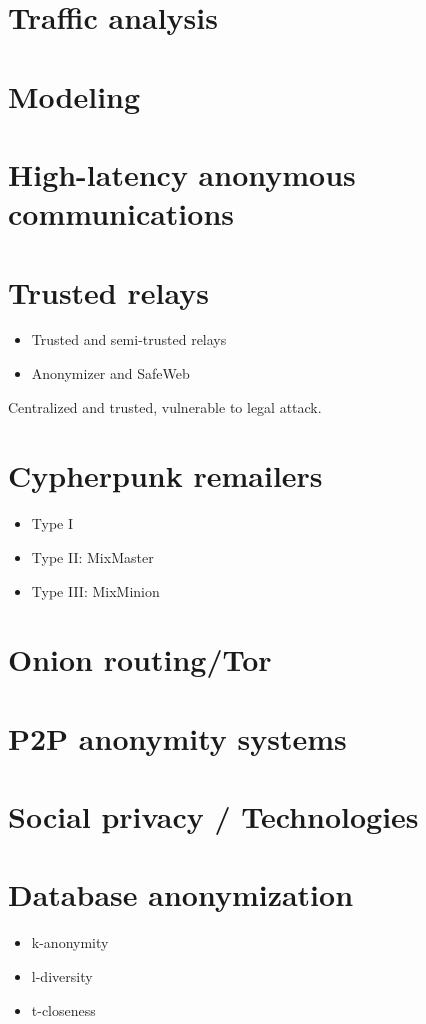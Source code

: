 \documentclass[a4paper,12pt,dutch]{article}
\begin{document}
\section{Traffic analysis}

\section{Modeling}

\section{High-latency anonymous communications}

\section{Trusted relays}
\begin{itemize}
	\item Trusted and semi-trusted relays
	\item Anonymizer and SafeWeb
\end{itemize}
Centralized and trusted, vulnerable to legal attack.

\section{Cypherpunk remailers}
\begin{itemize}
	\item Type I
	\item Type II: MixMaster
	\item Type III: MixMinion
\end{itemize}

\section{Onion routing/Tor}

\section{P2P anonymity systems}

\section{Social privacy / Technologies} %

\section{Database anonymization}
\begin{itemize}
	\item k-anonymity
	\item l-diversity
	\item t-closeness
\end{itemize}
\end{document}

